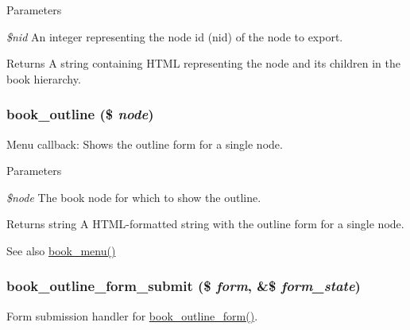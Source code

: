  
\begin{DoxyParams}{Parameters}
\item[{\em \$nid}]An integer representing the node id (nid) of the node to export.\end{DoxyParams}
\begin{DoxyReturn}{Returns}
A string containing HTML representing the node and its children in the book hierarchy. 
\end{DoxyReturn}
\hypertarget{book_8pages_8inc_a13983b7dd1920acb58635a7784c719b1}{
\subsubsection[{book\_\-outline}]{\setlength{\rightskip}{0pt plus 5cm}book\_\-outline (\$ {\em node})}}
\label{book_8pages_8inc_a13983b7dd1920acb58635a7784c719b1}
Menu callback: Shows the outline form for a single node.


\begin{DoxyParams}{Parameters}
\item[{\em \$node}]The book node for which to show the outline.\end{DoxyParams}
\begin{DoxyReturn}{Returns}
string A HTML-\/formatted string with the outline form for a single node.
\end{DoxyReturn}
\begin{DoxySeeAlso}{See also}
\hyperlink{book_8module_adc2bbd5235a769fa1ae9b02e8effc15e}{book\_\-menu()} 
\end{DoxySeeAlso}
\hypertarget{book_8pages_8inc_ad5f27af5889dbe2ad72df81fd4cd2665}{
\subsubsection[{book\_\-outline\_\-form\_\-submit}]{\setlength{\rightskip}{0pt plus 5cm}book\_\-outline\_\-form\_\-submit (\$ {\em form}, \/  \&\$ {\em form\_\-state})}}
\label{book_8pages_8inc_ad5f27af5889dbe2ad72df81fd4cd2665}
Form submission handler for \hyperlink{group__forms_ga4903d29a89909f072c1aab2f8d718bdb}{book\_\-outline\_\-form()}.


